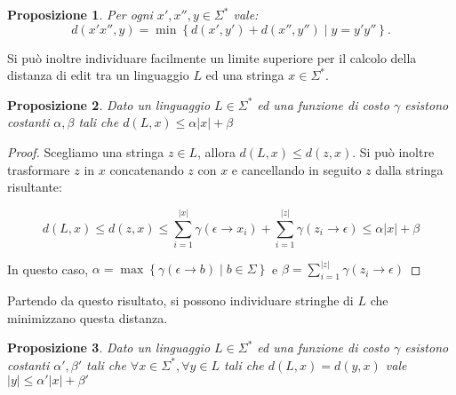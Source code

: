 \documentclass[a4paper,12pt]{report}
\theoremstyle{propositionstyle}
\newtheorem{prop}{Proposizione}[chapter]
\begin{document}
\begin{prop}
    Per ogni $x', x'', y \in \Sigma^*$ vale:
    \[
        d\left(x'x'', y\right) = \min\left\{d\left(x', y'\right) + d\left(x'', y''\right) \mid y = y'y''\right\}.
    \]
\end{prop}

    Si può inoltre individuare facilmente un limite superiore per il calcolo della distanza di edit
    tra un linguaggio $L$ ed una stringa $x \in \Sigma^*$.

    \begin{prop}\label{prop:distanza-limitata}
        Dato un linguaggio $L \in \Sigma^*$ ed una funzione di costo $\gamma$ esistono costanti $\alpha, \beta$ tali che
        $d\left(L, x\right) \leq \alpha \lvert x \rvert + \beta$
    \end{prop}

    \begin{proof}
        Scegliamo una stringa $z \in L$, allora $d\left(L, x\right) \leq d\left(z, x\right)$.
        Si può inoltre trasformare $z$ in $x$ concatenando $z$ con $x$ e cancellando in seguito $z$ dalla stringa risultante:

        $$\displaystyle d\left(L, x\right) \leq d\left(z, x\right) \leq \sum_{i=1}^{\lvert x \rvert} \gamma\left(\epsilon \rightarrow x_i\right) + \sum_{i=1}^{\lvert z \rvert} \gamma\left(z_i \rightarrow \epsilon\right) \leq \alpha \lvert x \rvert + \beta$$

        In questo caso, $\alpha = \max\left\{\gamma\left(\epsilon \rightarrow b\right) \mid b \in \Sigma\right\}$ e $\beta = \sum_{i=1}^{\lvert z \rvert} \gamma\left(z_i \rightarrow \epsilon\right)$
    \end{proof}

    Partendo da questo risultato, si possono individuare stringhe di $L$ che minimizzano questa distanza.

    \begin{prop}\label{prop:stringa-limitata}
        Dato un linguaggio $L \in \Sigma^*$ ed una funzione di costo $\gamma$ esistono costanti $\alpha', \beta'$ tali che
        $\forall{x \in \Sigma^*}, \forall{y \in L}$ tali che $d\left(L, x\right) = d\left(y, x\right)$ vale $\lvert y \rvert \leq \alpha' \lvert x \rvert + \beta'$
    \end{prop}
\end{document}
